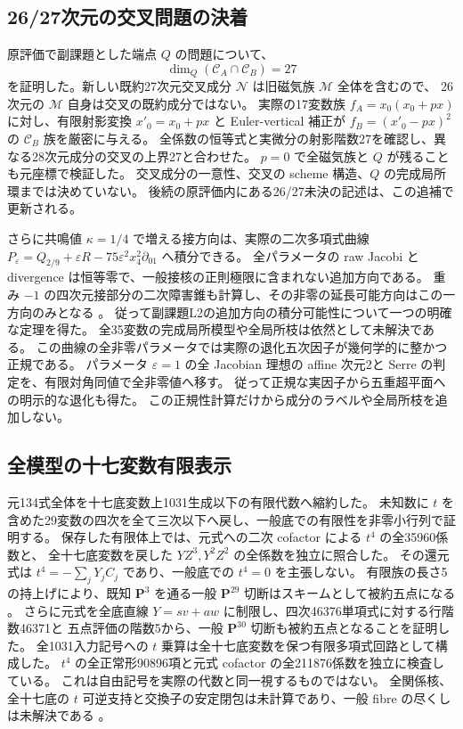 \documentclass[11pt,a4paper]{ltjsarticle}
\newcommand{\PP}{\mathbf P}\newcommand{\CC}{\mathbf C}\newcommand{\QQ}{\mathbf Q}
\theoremstyle{remark}\newtheorem{remark}[proposition]{注意}
\begin{document}
\subsection{26/27次元の交叉問題の決着}
原評価で副課題とした端点 $Q$ の問題について、
\[
 \dim_Q(\mathcal C_A\cap\mathcal C_B)=27
\]
を証明した。新しい既約27次元交叉成分 $\mathcal N$ は旧磁気族 $\mathcal M$ 全体を含むので、
26次元の $\mathcal M$ 自身は交叉の既約成分ではない。
実際の17変数族 $f_A=x_0(x_0+px)$ に対し、有限射影変換 $x'_0=x_0+px$ と Euler-vertical 補正が
$f_B=(x'_0-px)^2$ の $\mathcal C_B$ 族を厳密に与える。
全係数の恒等式と実微分の射影階数27を確認し、異なる28次元成分の交叉の上界27と合わせた。
$p=0$ で全磁気族と $Q$ が残ることも元座標で検証した\cite{intersection27-v62}。
交叉成分の一意性、交叉の scheme 構造、$Q$ の完成局所環までは決めていない。
後続の原評価内にある26/27未決の記述は、この追補で更新される。

さらに共鳴値 $\kappa=1/4$ で増える接方向は、実際の二次多項式曲線
$P_\varepsilon=Q_{2/9}+\varepsilon R-75\varepsilon^2x_4^2\partial_{01}$ へ積分できる。
全パラメータの raw Jacobi と divergence は恒等零で、一般接核の正則極限に含まれない追加方向である。
重み $-1$ の四次元接部分の二次障害錐も計算し、その非零の延長可能方向はこの一方向のみとなる
\cite{resonance-v62}。
従って副課題L2の追加方向の積分可能性について一つの明確な定理を得た。
全35変数の完成局所模型や全局所枝は依然として未解決である。
この曲線の全非零パラメータでは実際の退化五次因子が幾何学的に整かつ正規である。
パラメータ $\varepsilon=1$ の全 Jacobian 理想の affine 次元2と Serre の判定を、有限対角同値で全非零値へ移す。
従って正規な実因子から五重超平面への明示的な退化も得た\cite{resonant-normal-v62}。
この正規性計算だけから成分のラベルや全局所枝を追加しない。

\subsection{全模型の十七変数有限表示}
元134式全体を十七底変数上1031生成以下の有限代数へ縮約した。
未知数に $t$ を含めた29変数の四次を全て三次以下へ戻し、一般底での有限性を非零小行列で証明する。
保存した有限体上では、元式への二次 cofactor による $t^4$ の全35960係数と、
全十七底変数を戻した $YZ^3,Y^2Z^2$ の全係数を独立に照合した。
その還元式は $t^4=-\sum_jY_jC_j$ であり、一般底での $t^4=0$ を主張しない。
有限族の長さ5の持上げにより、既知 $\PP^3$ を通る一般 $\PP^{29}$ 切断はスキームとして被約五点になる
\cite{seventeen-v62}。
さらに元式を全底直線 $Y=sv+aw$ に制限し、四次46376単項式に対する行階数46371と
五点評価の階数5から、一般 $\PP^{30}$ 切断も被約五点となることを証明した。
全1031入力記号への $t$ 乗算は全十七底変数を保つ有限多項式回路として構成した。
$t^4$ の全正常形90896項と元式 cofactor の全211876係数を独立に検査している。
これは自由記号を実際の代数と同一視するものではない。
全関係核、全十七底の $t$ 可逆支持と交換子の安定閉包は未計算であり、一般 fibre の尽くしは未解決である
\cite{affine-final-v62}。
\end{document}
